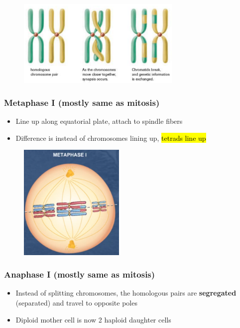 \documentclass[a4paper,12pt]{article}
\begin{document}
\begin{figure}[H]
    \centering
    \includegraphics[width=0.7\textwidth]{synapsis}
\end{figure}

\subsubsection{Metaphase I (mostly same as mitosis)}
\begin{itemize}
    \item{Line up along equatorial plate, attach to spindle fibers}
    \item{Difference is instead of chromosomes lining up, \hl{tetrads line up}}
\end{itemize}

\begin{figure}[H]
    \centering
    \includegraphics[width=0.45\textwidth]{metaphase-i}
\end{figure}

\subsubsection{Anaphase I (mostly same as mitosis)}
\begin{itemize}
    \item{Instead of splitting chromosomes, the homologous pairs are \textbf{segregated} (separated) and travel to opposite poles}
    \item{Diploid mother cell is now 2 haploid daughter cells}
\end{itemize}
\end{document}
